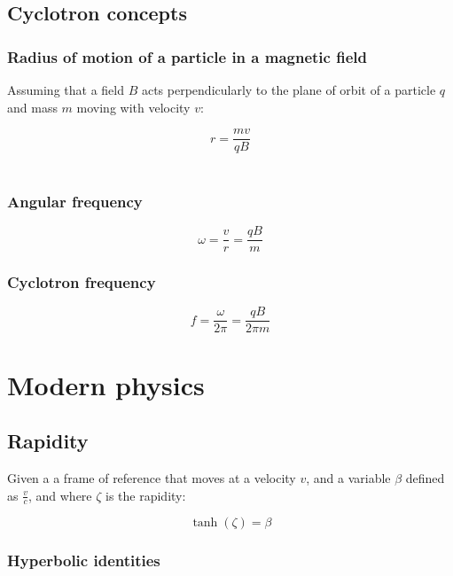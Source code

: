 \documentclass[12pt]{article}
\begin{document}
\subsection{Cyclotron concepts}

\subsubsection{Radius of motion of a particle in a magnetic field}

Assuming that a field $B$ acts perpendicularly to the plane of orbit of a particle $q$ and mass $m$ moving with velocity $v$:

\[
\boxed{
r = \frac{mv}{qB}
}
\]\\

\begin{multicols}{2}

\subsubsection{Angular frequency}

\[
\boxed{
\omega = \frac{v}{r}=\frac{qB}{m}
}
\]

\columnbreak

\subsubsection{Cyclotron frequency}

\[
\boxed{
f = \frac{\omega}{2\pi}=\frac{qB}{2\pi m}
}
\]

\end{multicols}

\newpage

\section{Modern physics}

\subsection{Rapidity}

Given a a frame of reference that moves at a velocity $v$, and a variable $\beta$ defined as $\frac{v}{c}$, and where $\zeta$ is the rapidity:

\[
\boxed{
\tanh(\zeta) = \beta
}
\]

\subsubsection{Hyperbolic identities}
\end{document}
